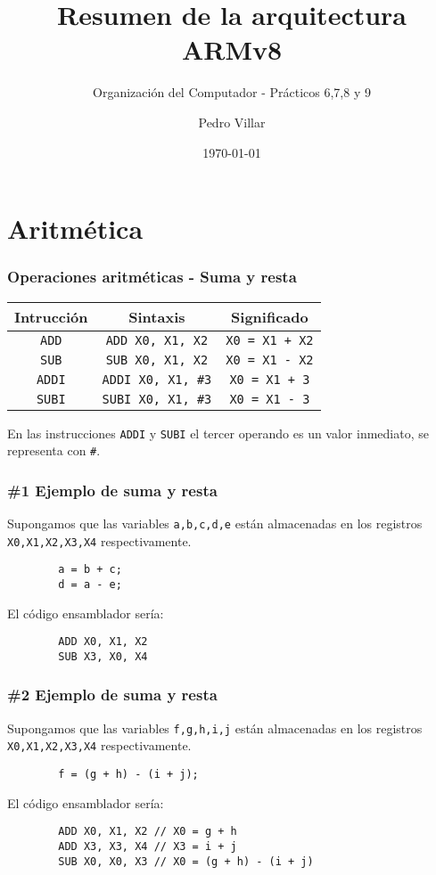 \documentclass[aspectradio=43]{beamer}
\title{Resumen de la arquitectura ARMv8}
\subtitle{Organización del Computador - Prácticos 6,7,8 y 9}
\author{Pedro Villar}
\date{\today}
\begin{document}
\begin{frame}
    \titlepage
\end{frame}

\section{Aritmética}
\begin{frame}
    \begin{table}
        \frametitle{Operaciones aritméticas - Suma y resta}
        \begin{tabular}{|c|c|c|}
            \hline
            \rowcolor{orange!20}
            \textbf{Intrucción} & \textbf{Sintaxis} & \textbf{Significado} \\
            \hline
            \texttt{ADD} & \texttt{ADD X0, X1, X2} & \texttt{X0 = X1 + X2} \\
            \texttt{SUB} & \texttt{SUB X0, X1, X2} & \texttt{X0 = X1 - X2} \\
            \texttt{ADDI} & \texttt{ADDI X0, X1, \#3} & \texttt{X0 = X1 + 3} \\
            \texttt{SUBI} & \texttt{SUBI X0, X1, \#3} & \texttt{X0 = X1 - 3} \\
            \hline
        \end{tabular}
    \end{table}
    En las instrucciones \texttt{ADDI} y \texttt{SUBI} el tercer operando es un valor inmediato, se representa con \texttt{\#}.
\end{frame}

\begin{frame}[containsverbatim]
    \frametitle{\#1 Ejemplo de suma y resta}
    Supongamos que las variables \texttt{a,b,c,d,e} están almacenadas en los registros \texttt{X0,X1,X2,X3,X4} respectivamente.\\
    \begin{verbatim}
        a = b + c;
        d = a - e;
    \end{verbatim}
    El código ensamblador sería:
    \begin{verbatim}
        ADD X0, X1, X2
        SUB X3, X0, X4
    \end{verbatim}
\end{frame}

\begin{frame}[containsverbatim]
    \frametitle{\#2 Ejemplo de suma y resta}
    Supongamos que las variables \texttt{f,g,h,i,j} están almacenadas en los registros \texttt{X0,X1,X2,X3,X4} respectivamente.\\
    \begin{verbatim}
        f = (g + h) - (i + j);
    \end{verbatim}
    El código ensamblador sería:
    \begin{verbatim}
        ADD X0, X1, X2 // X0 = g + h
        ADD X3, X3, X4 // X3 = i + j
        SUB X0, X0, X3 // X0 = (g + h) - (i + j)
    \end{verbatim}
\end{frame}
\end{document}
